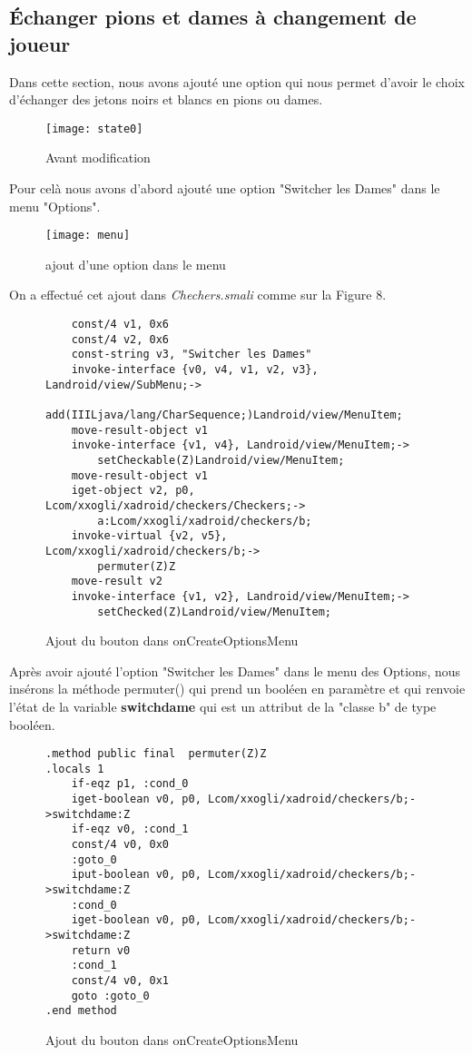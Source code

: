 
\subsection{Échanger pions et dames à changement de joueur}

Dans cette section, nous avons ajouté une option qui nous permet d'avoir le choix d'échanger 
des jetons noirs et blancs en pions ou dames.


\begin{figure}[hp]
	      \begin{center}
			\texttt{[image: state0]}
	      \end{center}
	\caption{Avant modification}
\end{figure}
Pour celà nous avons d'abord ajouté une option "Switcher les Dames" dans le menu "Options". 
\begin{figure}[h!]
	      \begin{center}
			\texttt{[image: menu]}
		  \end{center}
	\caption{ajout d'une option dans le menu}
\end{figure}
On a effectué cet ajout dans \textit{Chechers.smali} comme sur la Figure 8.\newpage

\begin{figure}[h!]
\begin{verbatim}
    const/4 v1, 0x6
    const/4 v2, 0x6
    const-string v3, "Switcher les Dames"
    invoke-interface {v0, v4, v1, v2, v3}, Landroid/view/SubMenu;->
		add(IIILjava/lang/CharSequence;)Landroid/view/MenuItem;
    move-result-object v1
    invoke-interface {v1, v4}, Landroid/view/MenuItem;->
		setCheckable(Z)Landroid/view/MenuItem;
    move-result-object v1
    iget-object v2, p0, Lcom/xxogli/xadroid/checkers/Checkers;->
		a:Lcom/xxogli/xadroid/checkers/b;
    invoke-virtual {v2, v5}, Lcom/xxogli/xadroid/checkers/b;->
		permuter(Z)Z
    move-result v2
    invoke-interface {v1, v2}, Landroid/view/MenuItem;->
		setChecked(Z)Landroid/view/MenuItem;
    \end{verbatim}
    \caption{Ajout du bouton dans onCreateOptionsMenu}
\end{figure}


Après avoir ajouté l'option "Switcher les Dames" dans le menu des Options, nous insérons la méthode permuter() qui prend 
un booléen en paramètre et qui renvoie l'état de la variable \textbf{switchdame} qui est un attribut de la "classe b" de type booléen.


\begin{figure}[!hp]
\begin{verbatim}
.method public final  permuter(Z)Z
.locals 1
    if-eqz p1, :cond_0
    iget-boolean v0, p0, Lcom/xxogli/xadroid/checkers/b;->switchdame:Z
    if-eqz v0, :cond_1
    const/4 v0, 0x0
    :goto_0
    iput-boolean v0, p0, Lcom/xxogli/xadroid/checkers/b;->switchdame:Z
    :cond_0
    iget-boolean v0, p0, Lcom/xxogli/xadroid/checkers/b;->switchdame:Z
    return v0
    :cond_1
    const/4 v0, 0x1
    goto :goto_0
.end method
\end{verbatim}
    \caption{Ajout du bouton dans onCreateOptionsMenu}
\end{figure}

